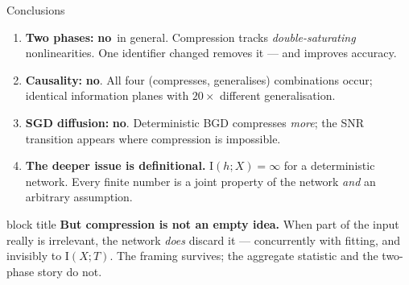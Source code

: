\documentclass[aspectratio=169,11pt]{beamer}
\newcommand{\I}{\mathrm{I}}
\newcommand{\no}{\textcolor{bad}{\textbf{no}}}
\begin{document}
\begin{frame}{Conclusions}
\begin{enumerate}
  \item \textbf{Two phases:} \no\ in general. Compression tracks
    \emph{double-saturating} nonlinearities. One identifier changed removes it ---
    and improves accuracy.
  \item \textbf{Causality:} \no. All four (compresses, generalises) combinations occur;
    identical information planes with $20\times$ different generalisation.
  \item \textbf{SGD diffusion:} \no. Deterministic BGD compresses \emph{more};
    the SNR transition appears where compression is impossible.
  \item \textbf{The deeper issue is definitional.} $\I(h;X)=\infty$ for a
    deterministic network. Every finite number is a joint property of the network
    \emph{and} an arbitrary assumption.
\end{enumerate}
\bigskip
\begin{beamercolorbox}[sep=6pt,center,rounded=true]{block title}
\textbf{But compression is not an empty idea.} When part of the input really is
irrelevant, the network \emph{does} discard it --- concurrently with fitting, and
invisibly to $\I(X;T)$. The framing survives; the aggregate statistic and the
two-phase story do not.
\end{beamercolorbox}
\end{frame}
\end{document}
